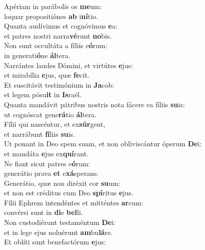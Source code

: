 \evenverse Apériam in parábolis os \textbf{me}um:~\*\\
\evenverse loquar propositiónes \textbf{ab} i\textbf{ní}tio.\\
\oddverse Quanta audívimus et cognóvimus \textbf{e}a:~\*\\
\oddverse et patres nostri narra\textbf{vé}runt \textbf{no}bis.\\
\evenverse Non sunt occultáta a fíliis e\textbf{ó}rum:~\*\\
\evenverse in generati\textbf{ó}ne \textbf{ál}tera.\\
\oddverse Narrántes laudes Dómini, et virtútes \textbf{e}jus:~\*\\
\oddverse et mirabília \textbf{e}jus, quæ \textbf{fe}cit.\\
\evenverse Et suscitávit testimónium in \textbf{Ja}cob:~\*\\
\evenverse et legem pósu\textbf{it} in \textbf{Is}raël.\\
\oddverse Quanta mandávit pátribus nostris nota fácere ea fíliis \textbf{su}is:~\*\\
\oddverse ut cognóscat gene\textbf{rá}tio \textbf{ál}tera.\\
\evenverse Fílii qui nascéntur, et ex\textbf{súr}gent,~\*\\
\evenverse et narrábunt \textbf{fí}liis \textbf{su}is.\\
\oddverse Ut ponant in Deo spem suam, et non obliviscántur óperum \textbf{De}i:~\*\\
\oddverse et mandáta \textbf{e}jus ex\textbf{quí}rant.\\
\evenverse Ne fiant sicut patres e\textbf{ó}rum:~\*\\
\evenverse generátio prava \textbf{et} e\textbf{xá}sperans.\\
\oddverse Generátio, quæ non diréxit cor \textbf{su}um:~\*\\
\oddverse et non est créditus cum Deo \textbf{spí}ritus \textbf{e}jus.\\
\evenverse Fílii Ephrem intendéntes et mitténtes \textbf{ar}cum:~\*\\
\evenverse convérsi sunt in \textbf{di}e \textbf{bel}li.\\
\oddverse Non custodiérunt testaméntum \textbf{De}i:~\*\\
\oddverse et in lege ejus noluérunt \textbf{am}bu\textbf{lá}re.\\
\evenverse Et oblíti sunt benefactórum \textbf{e}jus:~\*\\
